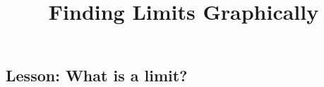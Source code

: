 \documentclass{ximera}
\title{Finding Limits Graphically}
\begin{document}
\begin{abstract}
\end{abstract}

\maketitle

\subsection{Lesson: What is a limit?}

\begin{center}  
\end{center}
\end{document}
